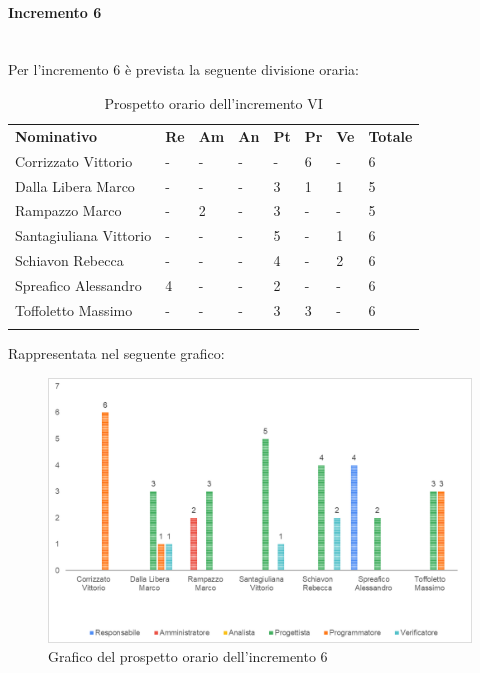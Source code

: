 \paragraph{Incremento 6} \mbox{} \\
Per l'incremento 6 è prevista la seguente divisione oraria:
\begin{longtable} {				
		>{}p{40mm}  
		>{}p{8mm}
		>{}p{8mm}
		>{}p{8mm}
		>{}p{8mm}
		>{}p{8mm}
		>{}p{8mm}
		>{}p{12mm}				
	}			
	\rowcolor{gray!50}
	\textbf{Nominativo} & \textbf{Re} & \textbf{Am} & \textbf{An} & \textbf{Pt} & \textbf{Pr} & \textbf{Ve} & \textbf{Totale}	\TBstrut \\ [2mm]
	Corrizzato Vittorio & - & - & - & - & 6 & - & 6 \TBstrut \\ [2mm]
	Dalla Libera Marco & - & - & - & 3 & 1 & 1 & 5 \TBstrut \\ [2mm]
	Rampazzo Marco & - & 2 & - & 3 & - & - & 5 \TBstrut \\ [2mm]
	Santagiuliana Vittorio & - & - & - & 5 & - & 1 & 6 \TBstrut \\ [2mm]
	Schiavon Rebecca & - & - & - & 4 & - & 2 & 6 \TBstrut \\ [2mm]
	Spreafico Alessandro & 4 & - & - & 2 & - & - & 6 \TBstrut \\ [2mm]
	Toffoletto Massimo & - & - & - & 3 & 3 & - & 6 \TBstrut \\ [2mm]
	\rowcolor{white}
	\caption{Prospetto orario dell'incremento VI}
\end{longtable}
Rappresentata nel seguente grafico:
\begin{figure} [H]
	\includegraphics[width=\linewidth]{./img/Grafici/19.png}
	\caption{Grafico del prospetto orario dell'incremento 6}
\end{figure}
